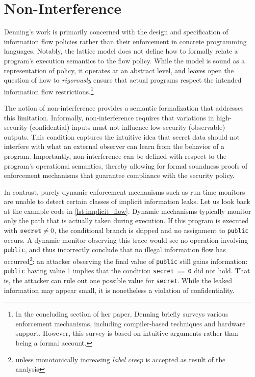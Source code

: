 \documentclass[12pt,a4paper,twoside]{book}
\begin{document}
\section{Non-Interference}
Denning's work\cite{denning1976lattice} is primarily concerned with the design and specification of information flow policies rather than their enforcement in concrete programming languages. Notably, the lattice model does not define how to formally relate a program's execution semantics to the flow policy. While the model is sound as a representation of policy, it operates at an abstract level, and leaves open the question of how to \textit{rigorously} ensure that actual programs respect the intended information flow restrictions.\footnote{In the concluding section of her paper, Denning briefly surveys various enforcement mechanisms, including compiler-based techniques and hardware support. However, this survey is based on intuitive arguments rather than being a formal account.}

The notion of non-interference\cite{goguen1982security} provides a semantic formalization that addresses this limitation. Informally, non-interference requires that variations in high-security (confidential) inputs must not influence low-security (observable) outputs\cite{volpano1996sound}. This condition captures the intuitive idea that secret data should not interfere with what an external observer can learn from the behavior of a program. Importantly, non-interference can be defined with respect to the program's operational semantics, thereby allowing for formal soundness proofs of enforcement mechanisms that guarantee compliance with the security policy\cite{volpano1996sound}.

In contrast, purely dynamic enforcement mechanisms such as run time monitors are unable to detect certain classes of implicit information leaks\cite{sabelfeld2003language}.
Let us look back at the example code in \ref{lst:implicit_flow}.
Dynamic mechanisms typically monitor only the path that is actually taken during execution. If this program is executed with $\verb|secret| \ne 0$, the conditional branch is skipped and no assignment to \verb|public| occurs. A dynamic monitor observing this trace would see no operation involving \verb|public|, and thus incorrectly conclude that no illegal information flow has occurred\footnote{unless monotonically increasing \emph{label creep}\cite{sabelfeld2003language} is accepted as result of the analysis}: an attacker observing the final value of \verb|public| still gains information: \verb|public| having value 1 implies that the condition \verb|secret == 0| did not hold. That is, the attacker can rule out one possible value for \verb|secret|. While the leaked information may appear small, it is nonetheless a violation of confidentiality.
\end{document}
